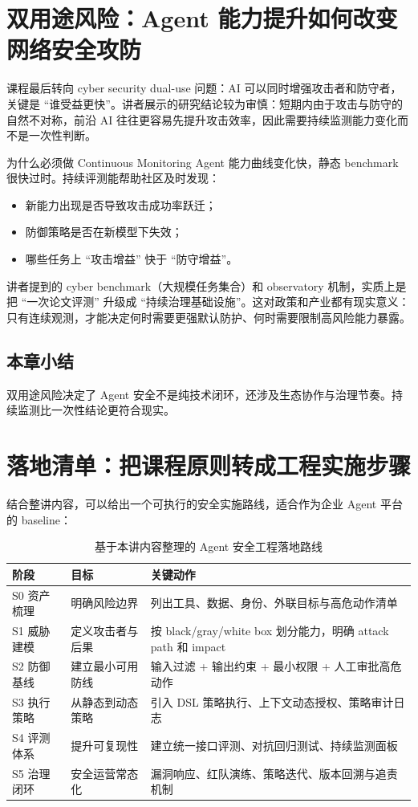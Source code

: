 \documentclass[a4paper]{article}
\begin{document}
\section{双用途风险：Agent 能力提升如何改变网络安全攻防}

课程最后转向 cyber security dual-use 问题：AI 可以同时增强攻击者和防守者，关键是 ``谁受益更快''。讲者展示的研究结论较为审慎：短期内由于攻击与防守的自然不对称，前沿 AI 往往更容易先提升攻击效率，因此需要持续监测能力变化而不是一次性判断。

\begin{importantbox}{为什么必须做 Continuous Monitoring}
Agent 能力曲线变化快，静态 benchmark 很快过时。持续评测能帮助社区及时发现：
\begin{itemize}
    \item 新能力出现是否导致攻击成功率跃迁；
    \item 防御策略是否在新模型下失效；
    \item 哪些任务上 ``攻击增益'' 快于 ``防守增益''。
\end{itemize}
\end{importantbox}

讲者提到的 cyber benchmark（大规模任务集合）和 observatory 机制，实质上是把 ``一次论文评测'' 升级成 ``持续治理基础设施''。这对政策和产业都有现实意义：只有连续观测，才能决定何时需要更强默认防护、何时需要限制高风险能力暴露。

\subsection{本章小结}
双用途风险决定了 Agent 安全不是纯技术闭环，还涉及生态协作与治理节奏。持续监测比一次性结论更符合现实。

\section{落地清单：把课程原则转成工程实施步骤}

结合整讲内容，可以给出一个可执行的安全实施路线，适合作为企业 Agent 平台的 baseline：

\begin{table}[H]
\centering
\begin{tabular}{p{1.7cm}p{3.1cm}p{5.8cm}}
\toprule
\textbf{阶段} & \textbf{目标} & \textbf{关键动作} \\
\midrule
S0 资产梳理 & 明确风险边界 & 列出工具、数据、身份、外联目标与高危动作清单 \\
S1 威胁建模 & 定义攻击者与后果 & 按 black/gray/white box 划分能力，明确 attack path 和 impact \\
S2 防御基线 & 建立最小可用防线 & 输入过滤 + 输出约束 + 最小权限 + 人工审批高危动作 \\
S3 执行策略 & 从静态到动态策略 & 引入 DSL 策略执行、上下文动态授权、策略审计日志 \\
S4 评测体系 & 提升可复现性 & 建立统一接口评测、对抗回归测试、持续监测面板 \\
S5 治理闭环 & 安全运营常态化 & 漏洞响应、红队演练、策略迭代、版本回溯与追责机制 \\
\bottomrule
\end{tabular}
\caption{基于本讲内容整理的 Agent 安全工程落地路线}
\end{table}
\end{document}
